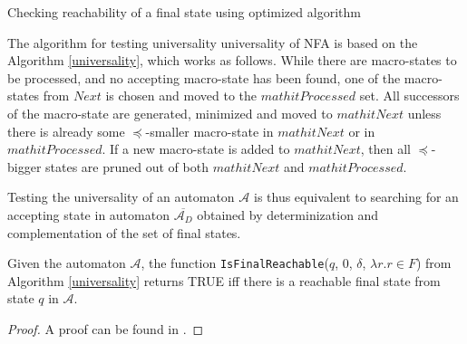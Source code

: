 \begin{algorithm}[ht!]
		\BlankLine
		\BlankLine
		\caption{Checking reachability of a
		final state using optimized algorithm\cite{tacas}}\label{universality}
	\end{algorithm}
	
The algorithm for testing universality universality of NFA is based on the
Algorithm \ref{universality}, which works as follows.
While there are macro-states to be processed, and no accepting macro-state has
been found, one of the macro-states from $\mathit{Next}$ is chosen and moved to
the $mathit{Processed}$ set. All successors of the macro-state are generated,
minimized and moved to $mathit{Next}$ unless there is already some
$\preceq$-smaller macro-state in $mathit{Next}$ or in $mathit{Processed}$. If a
new macro-state is added to $mathit{Next}$, then all $\preceq$-bigger states
are pruned out of both $mathit{Next}$ and $mathit{Processed}$.

Testing the universality of an automaton $\mathcal{A}$ is thus equivalent to
searching for an accepting state in automaton $\overline{\mathcal{A}_D}$
obtained by determinization and complementation of the set of final states.
	
\begin{lemma}\label{search-is-correct}
 Given the automaton $\mathcal{A}$, the function
 \texttt{IsFinalReachable}($q$, $0$, $\delta$, $\lambda r. r \in F$) from
 Algorithm \ref{universality} returns \textsc{TRUE} iff there is a reachable
 final state from state $q$ in $\mathcal{A}$.
\end{lemma}
\begin{proof}
 A proof can be found in \cite{raskin}.
\end{proof}

